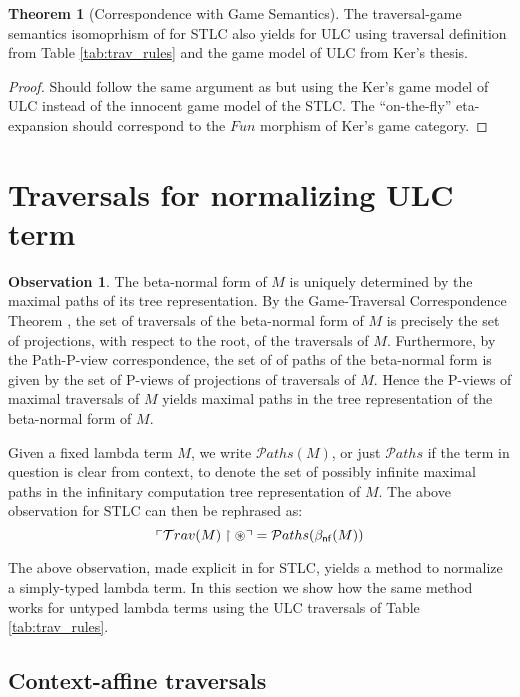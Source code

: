 \documentclass{article}
\theoremstyle{definition}
\newtheorem{theorem}{Theorem}[section]
\newtheorem{observation}{Observation}[section]
\newcommand\pathset{{\mathcal{P}aths}}
\begin{document}
\begin{theorem}[Correspondence with Game Semantics]
\label{thm:ulc_corresp}
The traversal-game semantics isomoprhism of \cite{BlumPhd} for STLC also yields for ULC using traversal definition from Table \ref{tab:trav_rules} and the game model of ULC from Ker's thesis.
\end{theorem}
\begin{proof}
Should follow the same argument as \cite{BlumPhd} but using the Ker's game model of ULC instead of the innocent game model of the STLC.
The ``on-the-fly'' eta-expansion should correspond to the $Fun$ morphism of Ker's game category.
\end{proof}


\section{Traversals for normalizing ULC term}

\begin{observation}
The beta-normal form of $M$ is uniquely determined by the maximal paths of its tree representation.
By the Game-Traversal Correspondence Theorem \cite{BlumPhd}, the set of traversals of the beta-normal form of $M$ is precisely the set of projections, with respect to the root, of the traversals of $M$. Furthermore, by the Path-P-view correspondence, the set of
of paths of the beta-normal form is given by the set of P-views of projections of traversals of $M$.
Hence the P-views of maximal traversals of $M$ yields maximal paths in the tree representation of the beta-normal form of $M$.
\end{observation}

Given a fixed lambda term $M$, we write $\pathset (M)$, or just $\pathset$ if the term in question is clear from context, to denote the set of possibly infinite maximal paths in the infinitary computation tree representation of $M$.  The above observation for STLC can then be rephrased as:
$$\pview{\travset(M)\filter\theroot} = \pathset(\betanf{M}) $$

The above observation, made explicit in \cite{BlumPhd} for STLC, yields a method to normalize a simply-typed lambda term.
In this section we show how the same method works for untyped lambda terms using the ULC traversals of Table \ref{tab:trav_rules}.


\subsection{Context-affine traversals}
\end{document}
